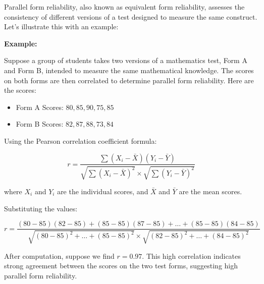 \documentclass[12pt, a4paper]{exam}
\begin{document}
Parallel form reliability, also known as equivalent form reliability, assesses the consistency of different versions of a test designed to measure the same construct. Let's illustrate this with an example:

\textbf{Example:}

Suppose a group of students takes two versions of a mathematics test, Form A and Form B, intended to measure the same mathematical knowledge. The scores on both forms are then correlated to determine parallel form reliability. Here are the scores:

\begin{itemize}
    \item Form A Scores: \( 80, 85, 90, 75, 85 \)
    \item Form B Scores: \( 82, 87, 88, 73, 84 \)
\end{itemize}

Using the Pearson correlation coefficient formula:

\[
r = \frac{\sum (X_i - \bar{X})(Y_i - \bar{Y})}{\sqrt{\sum (X_i - \bar{X})^2} \times \sqrt{\sum (Y_i - \bar{Y})^2}}
\]

where \(X_i\) and \(Y_i\) are the individual scores, and \(\bar{X}\) and \(\bar{Y}\) are the mean scores.

Substituting the values:

\[
r = \frac{(80-85)(82-85) + (85-85)(87-85) + \ldots + (85-85)(84-85)}{\sqrt{(80-85)^2 + \ldots  + (85-85)^2} \times \sqrt{(82-85)^2 + \ldots + (84-85)^2}}
\]

After computation, suppose we find \(r = 0.97\). This high correlation indicates strong agreement between the scores on the two test forms, suggesting high parallel form reliability.
\end{document}
